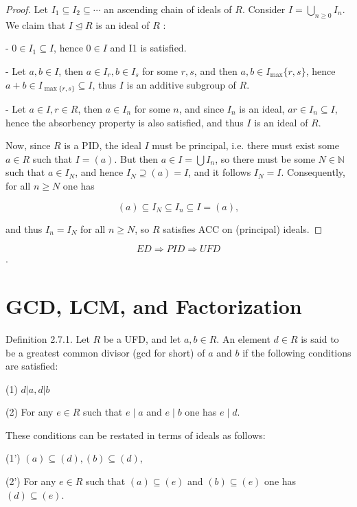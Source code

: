 \begin{proof}
    Let $I_{1} \subseteq I_{2} \subseteq \cdots$ an ascending chain of ideals of $R$. Consider $I=\bigcup_{n \geq 0} I_{n}$. We claim that $I \unlhd R$ is an ideal of $R$ :

    - $0 \in I_{1} \subseteq I$, hence $0 \in I$ and I1 is satisfied.
    
    - Let $a, b \in I$, then $a \in I_{r}, b \in I_{s}$ for some $r, s$, and then $a, b \in I_{\max }\{r, s\}$, hence $a+b \in I_{\max \{r, s\}} \subseteq I$, thus $I$ is an additive subgroup of $R$.
    
    - Let $a \in I, r \in R$, then $a \in I_{n}$ for some $n$, and since $I_{n}$ is an ideal, $a r \in I_{n} \subseteq I$, hence the absorbency property is also satisfied, and thus $I$ is an ideal of $R$.
    
    Now, since $R$ is a PID, the ideal $I$ must be principal, i.e. there must exist some $a \in R$ such that $I=(a)$. But then $a \in I=\bigcup I_{n}$, so there must be some $N \in \mathbb{N}$ such that $a \in I_{N}$, and hence $I_{N} \supseteq(a)=I$, and it follows $I_{N}=I$. Consequently, for all $n \geq N$ one has
    
    $$
    (a) \subseteq I_{N} \subseteq I_{n} \subseteq I=(a),
    $$
    
    and thus $I_{n}=I_{N}$ for all $n \geq N$, so $R$ satisfies ACC on (principal) ideals.
\end{proof} 

\begin{corollary}
    $$
E D \Rightarrow P I D \Rightarrow U F D
$$.
\end{corollary}


\section{GCD, LCM, and Factorization}

Definition 2.7.1. Let $R$ be a UFD, and let $a, b \in R$. An element $d \in R$ is said to be a greatest common divisor (gcd for short) of $a$ and $b$ if the following conditions are satisfied:

(1) $d|a, d| b$

(2) For any $e \in R$ such that $e \mid a$ and $e \mid b$ one has $e \mid d$.

These conditions can be restated in terms of ideals as follows:

(1') $(a) \subseteq(d),(b) \subseteq(d)$,

(2') For any $e \in R$ such that $(a) \subseteq(e)$ and $(b) \subseteq(e)$ one has $(d) \subseteq(e)$.

